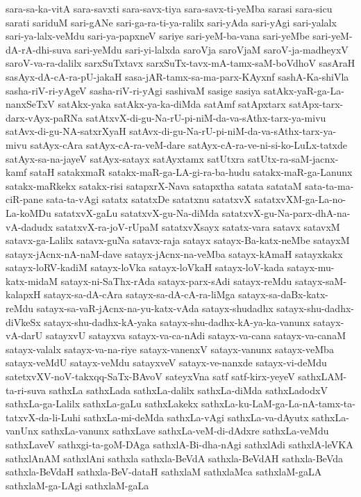 {sara-sa-ka-vitA
sara-savxti
sara-savx-tiya
sara-savx-ti-yeMba
sarasi
sara-sicu
sarati
sariduM
sari-gANe
sari-ga-ra-ti-ya-ralilx
sari-yAda
sari-yAgi
sari-yalalx
sari-ya-lalx-veMdu
sari-ya-papxneV
sariye
sari-yeM-ba-vana
sari-yeMbe
sari-yeM-dA-rA-dhi-suva
sari-yeMdu
sari-yi-lalxda
saroVja
saroVjaM
saroV-ja-madheyxV
saroV-va-ra-dalilx
sarxSuTxtavx
sarxSuTx-tavx-mA-tamx-saM-boVdhoV
sasAraH
sasAyx-dA-cA-ra-pU-jakaH
sasa-jAR-tamx-sa-ma-parx-KAyxnf
sashA-Ka-shiVla
sasha-riV-ri-yAgeV
sasha-riV-ri-yAgi
sashivaM
sasige
sasiya
satAkx-yaR-ga-La-nanxSeTxV
satAkx-yaka
satAkx-ya-ka-diMda
satAmf
satApxtarx
satApx-tarx-darx-vAyx-paRNa
satAtxvX-di-gu-Na-rU-pi-niM-da-va-sAthx-tarx-ya-mivu
satAvx-di-gu-NA-satxrXyaH
satAvx-di-gu-Na-rU-pi-niM-da-va-sAthx-tarx-ya-mivu
satAyx-cAra
satAyx-cA-ra-veM-dare
satAyx-cA-ra-ve-ni-si-ko-LuLx-tatxde
satAyx-sa-na-jayeV
satAyx-satayx
satAyxtamx
satUtxra
satUtx-ra-saM-jacnx-kamf
sataH
satakxmaR
satakx-maR-ga-LA-gi-ra-ba-hudu
satakx-maR-ga-Lanunx
satakx-maRkekx
satakx-risi
satapxrX-Nava
satapxtha
satata
satataM
sata-ta-ma-ciR-pane
sata-ta-vAgi
satatx
satatxDe
satatxnu
satatxvX
satatxvXM-ga-La-no-La-koMDu
satatxvX-gaLu
satatxvX-gu-Na-diMda
satatxvX-gu-Na-parx-dhA-na-vA-dadudx
satatxvX-ra-joV-rUpaM
satatxvXsayx
satatx-vara
satavx
satavxM
satavx-ga-Lalilx
satavx-guNa
satavx-raja
satayx
satayx-Ba-katx-neMbe
satayxM
satayx-jAcnx-nA-naM-dave
satayx-jAcnx-na-veMba
satayx-kAmaH
satayxkakx
satayx-loRV-kadiM
satayx-loVka
satayx-loVkaH
satayx-loV-kada
satayx-mu-katx-midaM
satayx-ni-SaThx-rAda
satayx-parx-sAdi
satayx-reMdu
satayx-saM-kalapxH
satayx-sa-dA-cAra
satayx-sa-dA-cA-ra-liMga
satayx-sa-daBx-katx-reMdu
satayx-sa-vaR-jAcnx-na-yu-katx-vAda
satayx-shudadhx
satayx-shu-dadhx-diVkeSx
satayx-shu-dadhx-kA-yaka
satayx-shu-dadhx-kA-ya-ka-vanunx
satayx-vA-darU
satayxvU
satayxva
satayx-va-ca-nAdi
satayx-va-cana
satayx-va-canaM
satayx-valalx
satayx-va-na-riye
satayx-vanenxV
satayx-vanunx
satayx-veMba
satayx-veMdU
satayx-veMdu
satayxveV
satayx-ve-nanxde
satayx-vi-deMdu
satetxvXV-noV-takxqq-SaTx-BAvoV
sateyxVna
satf
satf-kirx-yeyeV
sathxLAM-ta-ri-suva
sathxLa
sathxLada
sathxLa-dalilx
sathxLa-diMda
sathxLadodxV
sathxLa-ga-Lalilx
sathxLa-gaLu
sathxLakekx
sathxLa-ku-LaM-ga-La-nA-tamx-ta-tatxvX-da-li-Luhi
sathxLa-mi-deMda
sathxLa-vAgi
sathxLa-va-dAyutx
sathxLa-vanUnx
sathxLa-vanunx
sathxLave
sathxLa-veM-di-dAdxre
sathxLa-veMdu
sathxLaveV
sathxgi-ta-goM-DAga
sathxlA-Bi-dha-nAgi
sathxlAdi
sathxlA-leVKA
sathxlAnAM
sathxlAni
sathxla
sathxla-BeVdA
sathxla-BeVdAH
sathxla-BeVda
sathxla-BeVdaH
sathxla-BeV-dataH
sathxlaM
sathxlaMca
sathxlaM-gaLA
sathxlaM-ga-LAgi
sathxlaM-gaLa
}
